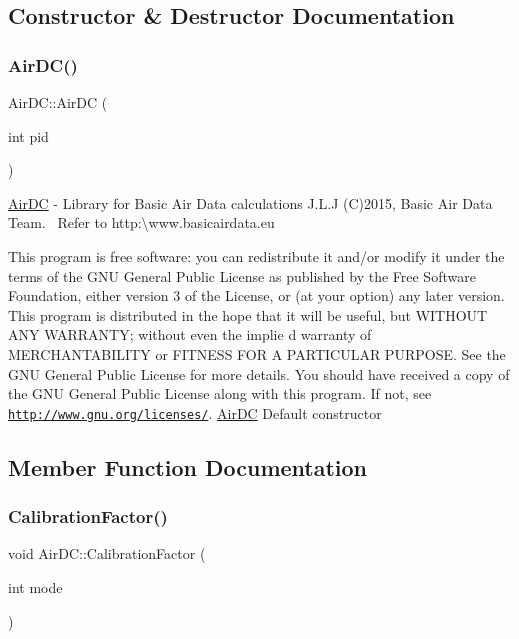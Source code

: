 \subsection{Constructor \& Destructor Documentation}
\mbox{\label{class_air_d_c_ad8fd49af8bf2b7db4dee29fe9bc28bb6}} 
\subsubsection{\texorpdfstring{Air\+D\+C()}{AirDC()}}
{\footnotesize\ttfamily Air\+D\+C\+::\+Air\+DC (\begin{DoxyParamCaption}\item[{int}]{pid }\end{DoxyParamCaption})}

\hyperlink{class_air_d_c}{Air\+DC} -\/ Library for Basic Air Data calculations J.\+L.\+J (C)2015, Basic Air Data Team.~\newline
 Refer to http\+:\textbackslash{}www.\+basicairdata.\+eu

This program is free software\+: you can redistribute it and/or modify it under the terms of the G\+NU General Public License as published by the Free Software Foundation, either version 3 of the License, or (at your option) any later version. This program is distributed in the hope that it will be useful, but W\+I\+T\+H\+O\+UT A\+NY W\+A\+R\+R\+A\+N\+TY; without even the implie d warranty of M\+E\+R\+C\+H\+A\+N\+T\+A\+B\+I\+L\+I\+TY or F\+I\+T\+N\+E\+SS F\+OR A P\+A\+R\+T\+I\+C\+U\+L\+AR P\+U\+R\+P\+O\+SE. See the G\+NU General Public License for more details. You should have received a copy of the G\+NU General Public License along with this program. If not, see \href{http://www.gnu.org/licenses/}{\tt http\+://www.\+gnu.\+org/licenses/}. \hyperlink{class_air_d_c}{Air\+DC} Default constructor 

\subsection{Member Function Documentation}
\mbox{\label{class_air_d_c_ab324f87db272c1c9471b25536ba5e5bf}} 
\subsubsection{\texorpdfstring{Calibration\+Factor()}{CalibrationFactor()}}
{\footnotesize\ttfamily void Air\+D\+C\+::\+Calibration\+Factor (\begin{DoxyParamCaption}\item[{int}]{mode }\end{DoxyParamCaption})}


